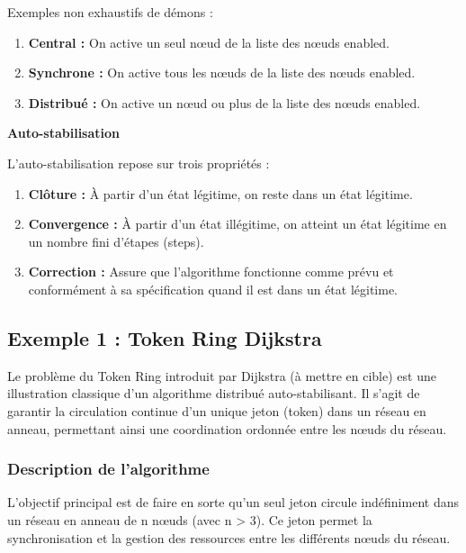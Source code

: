 \documentclass[11pt]{article}
\begin{document}
Exemples non exhaustifs de démons :
\begin{enumerate}
\item \textbf{\textbf{Central :}} On active un seul nœud de la liste des nœuds enabled.
\item \textbf{\textbf{Synchrone :}} On active tous les nœuds de la liste des nœuds enabled.
\item \textbf{\textbf{Distribué :}} On active un nœud ou plus de la liste des nœuds enabled.
\end{enumerate}

\textbf{\textbf{Auto-stabilisation}}

L'auto-stabilisation repose sur trois propriétés :
\begin{enumerate}
\item \textbf{\textbf{Clôture :}} À partir d'un état légitime, on reste dans un état légitime.
\item \textbf{\textbf{Convergence :}} À partir d'un état illégitime, on atteint un état légitime en un nombre fini d'étapes (steps).
\item \textbf{\textbf{Correction :}} Assure que l'algorithme fonctionne comme prévu et conformément à sa spécification quand il est dans un état légitime.
\end{enumerate}



\subsection{Exemple 1 : Token Ring Dijkstra}
\label{sec:org44c316f}

Le problème du Token Ring introduit par Dijkstra (à mettre en cible) est une illustration classique d'un algorithme distribué auto-stabilisant. 
Il s'agit de garantir la circulation continue d'un unique jeton (token) dans un réseau en anneau, permettant ainsi une coordination ordonnée entre les nœuds du réseau.

\subsubsection{Description de l'algorithme}
\label{sec:org1355d5e}

L'objectif principal est de faire en sorte qu'un seul jeton circule indéfiniment dans un réseau en anneau de n nœuds (avec n > 3). 
Ce jeton permet la synchronisation et la gestion des ressources entre les différents nœuds du réseau.
\end{document}
